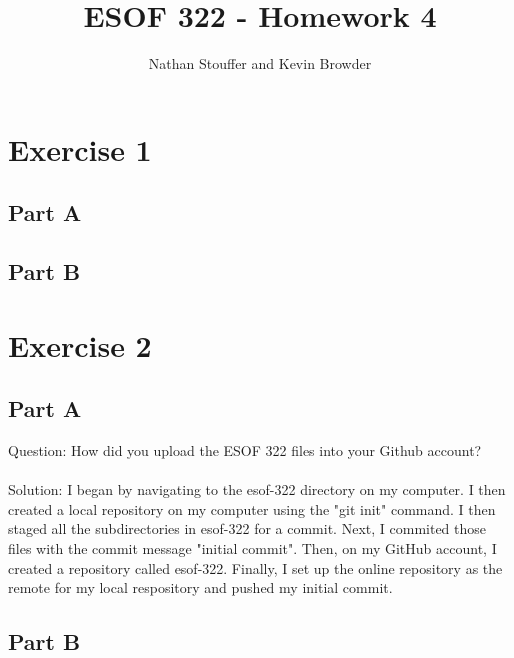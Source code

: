 \documentclass{article}
\begin{document}
	
\title{ESOF 322 - Homework 4}
\author{Nathan Stouffer and Kevin Browder}

\maketitle
\newpage

\section*{Exercise 1}


\subsection*{Part A}



\subsection*{Part B}

\newpage

\section*{Exercise 2}

\subsection*{Part A}

Question: How did you upload the ESOF 322 files into your Github account? \\\\
Solution: I began by navigating to the esof-322 directory on my computer. I then created a local repository on my computer using the "git init" command. 
I then staged all the subdirectories in esof-322 for a commit. Next, I commited those files with the commit message "initial commit".
Then, on my GitHub account, I created a repository called esof-322.
Finally, I set up the online repository as the remote for my local respository and pushed my initial commit.

\subsection*{Part B}
\end{document}
